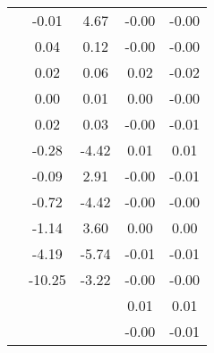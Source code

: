 \begin{table}
\begin{tabular}{c|cc|cc|}
\multicolumn{1}{|c|}{} & \multicolumn{1}{|c|}{     -0.01} & \multicolumn{1}{|c|}{      4.67} & \multicolumn{1}{|c|}{     -0.00} & \multicolumn{1}{|c|}{     -0.00} \\ 
\multicolumn{1}{|c|}{} & \multicolumn{1}{|c|}{      0.04} & \multicolumn{1}{|c|}{      0.12} & \multicolumn{1}{|c|}{     -0.00} & \multicolumn{1}{|c|}{     -0.00} \\ 
\multicolumn{1}{|c|}{} & \multicolumn{1}{|c|}{      0.02} & \multicolumn{1}{|c|}{      0.06} & \multicolumn{1}{|c|}{      0.02} & \multicolumn{1}{|c|}{     -0.02} \\ 
\multicolumn{1}{|c|}{} & \multicolumn{1}{|c|}{      0.00} & \multicolumn{1}{|c|}{      0.01} & \multicolumn{1}{|c|}{      0.00} & \multicolumn{1}{|c|}{     -0.00} \\ 
\multicolumn{1}{|c|}{} & \multicolumn{1}{|c|}{      0.02} & \multicolumn{1}{|c|}{      0.03} & \multicolumn{1}{|c|}{     -0.00} & \multicolumn{1}{|c|}{     -0.01} \\ 
\multicolumn{1}{|c|}{} & \multicolumn{1}{|c|}{     -0.28} & \multicolumn{1}{|c|}{     -4.42} & \multicolumn{1}{|c|}{      0.01} & \multicolumn{1}{|c|}{      0.01} \\ 
\multicolumn{1}{|c|}{} & \multicolumn{1}{|c|}{     -0.09} & \multicolumn{1}{|c|}{      2.91} & \multicolumn{1}{|c|}{     -0.00} & \multicolumn{1}{|c|}{     -0.01} \\ 
\multicolumn{1}{|c|}{} & \multicolumn{1}{|c|}{     -0.72} & \multicolumn{1}{|c|}{     -4.42} & \multicolumn{1}{|c|}{     -0.00} & \multicolumn{1}{|c|}{     -0.00} \\ 
\multicolumn{1}{|c|}{} & \multicolumn{1}{|c|}{     -1.14} & \multicolumn{1}{|c|}{      3.60} & \multicolumn{1}{|c|}{      0.00} & \multicolumn{1}{|c|}{      0.00} \\ 
\multicolumn{1}{|c|}{} & \multicolumn{1}{|c|}{     -4.19} & \multicolumn{1}{|c|}{     -5.74} & \multicolumn{1}{|c|}{     -0.01} & \multicolumn{1}{|c|}{     -0.01} \\ 
\multicolumn{1}{|c|}{} & \multicolumn{1}{|c|}{    -10.25} & \multicolumn{1}{|c|}{     -3.22} & \multicolumn{1}{|c|}{     -0.00} & \multicolumn{1}{|c|}{     -0.00} \\ 
\multicolumn{1}{|c|}{} & \multicolumn{1}{|c|}{} & \multicolumn{1}{|c|}{} & \multicolumn{1}{|c|}{      0.01} & \multicolumn{1}{|c|}{      0.01} \\ 
\multicolumn{1}{|c|}{} & \multicolumn{1}{|c|}{} & \multicolumn{1}{|c|}{} & \multicolumn{1}{|c|}{     -0.00} & \multicolumn{1}{|c|}{     -0.01} \\ 

\end{tabular}
\end{table}
